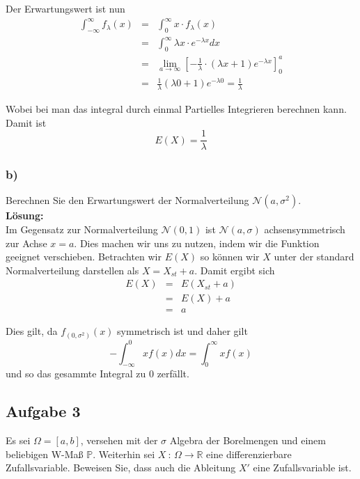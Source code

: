 \documentclass[11pt,a4paper,ngerman]{article}
\begin{document}
Der Erwartungswert ist nun
$$\begin{array}{rcl}
    \int_{-\infty}^\infty f_\lambda (x) &=& \int^\infty_0 x \cdot f_\lambda (x)\\
                &=& \int^\infty_0 \lambda x \cdot e^{-\lambda x} dx\\
                &=& \underset{a \rightarrow \infty}{\lim} \left[ - \frac{1}{\lambda} \cdot (\lambda x  + 1) e^{-\lambda x}\right]_0^a\\
                &=& \frac{1}{\lambda} (\lambda 0 + 1) e^{-\lambda 0} = \frac{1}{\lambda}
\end{array}$$

Wobei bei man das integral durch einmal Partielles Integrieren berechnen kann. Damit ist
$$E(X) = \frac{1}{\lambda}$$


\subsubsection*{b)}

Berechnen Sie den Erwartungswert der Normalverteilung $\mathcal{N}(a, \sigma^2)$.\\

\textbf{Lösung:}\\

Im Gegensatz zur Normalverteilung $\mathcal{N}(0,1)$ ist $\mathcal{N}(a,\sigma)$ achsensymmetrisch zur Achse $x = a$. Dies machen wir uns zu nutzen,
indem wir die Funktion geeignet verschieben. Betrachten wir $E(X)$ so können wir $X$ unter der standard Normalverteilung darstellen als
$X = X_{st} + a$. Damit ergibt sich
$$\begin{array}{rcl}
    E(X)    &=& E(X_{st} + a)\\
            &=& E(X) + a\\
            &=& a
\end{array}$$

Dies gilt, da $f_{(0,\sigma^2)}(x)$ symmetrisch ist und daher gilt
$$
    -\int_{-\infty}^0 x f(x) dx = \int_0^\infty x f(x)
$$
und so das gesammte Integral zu $0$ zerfällt.

\subsection*{Aufgabe 3}

Es sei $\Omega = [a,b]$, versehen mit der $\sigma$ Algebra der Borelmengen und einem beliebigen W-Maß $\mathbb{P}$. Weiterhin sei $X \ : \, \Omega \rightarrow \mathbb{R}$ eine
differenzierbare Zufallsvariable. Beweisen Sie, dass auch die Ableitung $X'$ eine Zufallsvariable ist.\\
\end{document}
